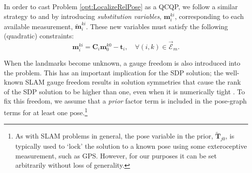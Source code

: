 \documentclass[lettersize,journal]{IEEEtran}
\newcommand{\EdgeSet}{\vec{\bm{\mathcal{E}}}}
\begin{document}
In order to cast Problem \eqref{opt:LocalizeRelPose} as a QCQP, we follow a similar strategy to \cite{dumbgenSafeSmoothCertified2023} and \cite{brialesCertifiablyGloballyOptimal2018} by introducing \textit{substitution variables}, $ \bm{m}_i^{ki} $, corresponding to each available measurement, $ \tilde{\bm{m}}_i^{ki} $. These new variables must satisfy the following (quadratic) constraints:
\begin{equation}
	\bm{m}_i^{ki} = \bm{C}_i	\bm{m}_0^{k0} - \bm{t}_i, \quad \forall (i,k)\in\EdgeSet_m.
\end{equation}

When the landmarks become unknown, a gauge freedom is also introduced into the problem. This has an important implication for the SDP solution; the well-known SLAM gauge freedom results in solution symmetries that cause the rank of the SDP solution to be higher than one, even when it is numerically tight \cite{brialesCertifiablyGloballyOptimal2018}. To fix this freedom, we assume that a \emph{prior} factor term is included in the pose-graph terms for at least one pose.\footnote{As with SLAM problems in general, the pose variable in the prior, $\tilde{\bm{T}}_{j0}$, is typically used to `lock' the solution to a known pose using some exteroceptive measurement, such as GPS. However, for our purposes it can be set arbitrarily without loss of generality.}
\end{document}
